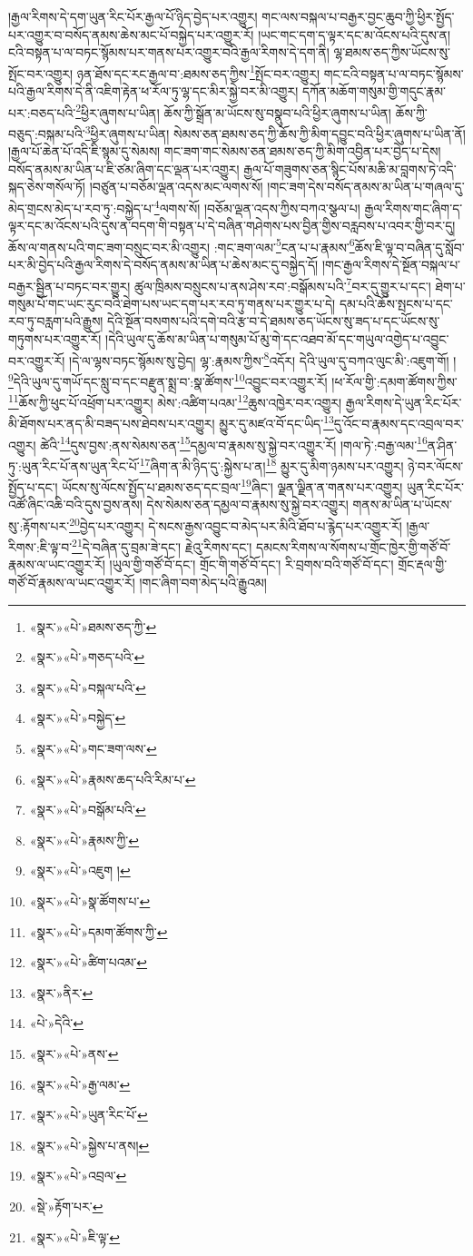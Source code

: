 །རྒྱལ་རིགས་དེ་དག་ཡུན་རིང་པོར་རྒྱལ་པོ་ཉིད་བྱེད་པར་འགྱུར། གང་ལས་བསྐལ་པ་བརྒྱར་བྱང་ཆུབ་ཀྱི་ཕྱིར་སྤྱོད་པར་འགྱུར་བ་བསོད་ནམས་ཆེས་མང་པོ་བསྐྱེད་པར་འགྱུར་རོ། །ཡང་གང་དག་ད་ལྟར་དང་མ་འོངས་པའི་དུས་ན། ངའི་བསྟན་པ་ལ་བཏང་སྙོམས་པར་གནས་པར་འགྱུར་བའི་རྒྱལ་རིགས་དེ་དག་ནི། ལྷ་ཐམས་ཅད་ཀྱིས་ཡོངས་སུ་སྤོང་བར་འགྱུར། ཉན་ཐོས་དང་རང་རྒྱལ་བ་:ཐམས་ཅད་ཀྱིས་\footnote{«སྣར་»«པེ་»ཐམས་ཅད་ཀྱི་}སྤོང་བར་འགྱུར། གང་ངའི་བསྟན་པ་ལ་བཏང་སྙོམས་པའི་རྒྱལ་རིགས་དེ་ནི་འཇིག་རྟེན་ཕ་རོལ་ཏུ་ལྷ་དང་མིར་སྐྱེ་བར་མི་འགྱུར། དཀོན་མཆོག་གསུམ་གྱི་གདུང་རྣམ་པར་:བཅད་པའི་\footnote{«སྣར་»«པེ་»གཅད་པའི་}ཕྱིར་ཞུགས་པ་ཡིན། ཆོས་ཀྱི་སྒྲོན་མ་ཡོངས་སུ་བསྣུབ་པའི་ཕྱིར་ཞུགས་པ་ཡིན། ཆོས་ཀྱི་བཅུད་:བསྐམ་པའི་\footnote{«སྣར་»«པེ་»བསྐལ་པའི་}ཕྱིར་ཞུགས་པ་ཡིན། སེམས་ཅན་ཐམས་ཅད་ཀྱི་ཆོས་ཀྱི་མིག་དབྱུང་བའི་ཕྱིར་ཞུགས་པ་ཡིན་ནོ། །རྒྱལ་པོ་ཆེན་པོ་འདི་ཇི་སྙམ་དུ་སེམས། གང་ཟག་གང་སེམས་ཅན་ཐམས་ཅད་ཀྱི་མིག་འབྱིན་པར་བྱེད་པ་དེས། བསོད་ནམས་མ་ཡིན་པ་ཇི་ཙམ་ཞིག་དང་ལྡན་པར་འགྱུར། རྒྱལ་པོ་གཟུགས་ཅན་སྙིང་པོས་མཆི་མ་བླགས་ཏེ་འདི་སྐད་ཅེས་གསོལ་ཏོ། །བཙུན་པ་བཅོམ་ལྡན་འདས་མང་ལགས་སོ། །གང་ཟག་དེས་བསོད་ནམས་མ་ཡིན་པ་གཞལ་དུ་མེད་གྲངས་མེད་པ་རབ་ཏུ་:བསྐྱེད་པ་\footnote{«སྣར་»«པེ་»བསྐྱེད་}ལགས་སོ། །བཅོམ་ལྡན་འདས་ཀྱིས་བཀའ་སྩལ་པ། རྒྱལ་རིགས་གང་ཞིག་ད་ལྟར་དང་མ་འོངས་པའི་དུས་ན་བདག་གི་བསྟན་པ་དེ་བཞིན་གཤེགས་པས་བྱིན་གྱིས་བརླབས་པ་འབར་གྱི་བར་དུ། ཆོས་ལ་གནས་པའི་གང་ཟག་བསྲུང་བར་མི་འགྱུར། :གང་ཟག་ལམ་\footnote{«སྣར་»«པེ་»གང་ཟག་ལས་}ངན་པ་པ་རྣམས་\footnote{«སྣར་»«པེ་»རྣམས་ཆད་པའི་རིམ་པ་}ཆོས་ཇི་ལྟ་བ་བཞིན་དུ་སློབ་པར་མི་བྱེད་པའི་རྒྱལ་རིགས་དེ་བསོད་ནམས་མ་ཡིན་པ་ཆེས་མང་དུ་བསྐྱེད་དོ། །གང་རྒྱལ་རིགས་དེ་སྔོན་བསྐལ་པ་བརྒྱར་སྦྱིན་པ་བཏང་བར་གྱུར། ཚུལ་ཁྲིམས་བསྲུངས་པ་ནས་ཤེས་རབ་:བསྒོམས་པའི་\footnote{«སྣར་»«པེ་»བསྒོམ་པའི་}བར་དུ་གྱུར་པ་དང་། ཐེག་པ་གསུམ་པོ་གང་ཡང་རུང་བའི་ཐེག་པས་ཡང་དག་པར་རབ་ཏུ་གནས་པར་གྱུར་པ་དེ། དམ་པའི་ཆོས་སྤངས་པ་དང་རབ་ཏུ་བརླག་པའི་རྒྱུས། དེའི་སྔོན་བསགས་པའི་དགེ་བའི་རྩ་བ་དེ་ཐམས་ཅད་ཡོངས་སུ་ཟད་པ་དང་ཡོངས་སུ་གཏུགས་པར་འགྱུར་རོ། །དེའི་ཡུལ་དུ་ཆོས་མ་ཡིན་པ་གསུམ་པོ་མུ་གེ་དང་འཐབ་མོ་དང་གཡུལ་འགྱེད་པ་འབྱུང་བར་འགྱུར་རོ། །དེ་ལ་ལྷས་བཏང་སྙོམས་སུ་བྱེད། ལྷ་:རྣམས་ཀྱིས་\footnote{«སྣར་»«པེ་»རྣམས་ཀྱི་}འདོར། དེའི་ཡུལ་དུ་བཀའ་ལུང་མི་:འཇུག་གོ། །\footnote{«སྣར་»«པེ་»འཇུག །}དེའི་ཡུལ་དུ་གཡོ་དང་སླུ་བ་དང་བརྫུན་སྨྲ་བ་:སྣ་ཚོགས་\footnote{«སྣར་»«པེ་»སྣ་ཚོགས་པ་}འབྱུང་བར་འགྱུར་རོ། །ཕ་རོལ་གྱི་:དམག་ཚོགས་ཀྱིས་\footnote{«སྣར་»«པེ་»དམག་ཚོགས་ཀྱི་}ཆོས་ཀྱི་ཕུང་པོ་འཕྲོག་པར་འགྱུར། མེས་:འཚིག་པའམ་\footnote{«སྣར་»«པེ་»ཚིག་པའམ་}ཆུས་འཁྱེར་བར་འགྱུར། རྒྱལ་རིགས་དེ་ཡུན་རིང་པོར་མི་ཐོགས་པར་ནད་མི་བཟད་པས་ཐེབས་པར་འགྱུར། མྱུར་དུ་མཛའ་བོ་དང་ཡིད་\footnote{«སྣར་»ནིར་}དུ་འོང་བ་རྣམས་དང་འབྲལ་བར་འགྱུར། ཚེའི་\footnote{«པེ་»དེའི་}དུས་བྱས་:ནས་སེམས་ཅན་\footnote{«སྣར་»«པེ་»ནས་}དམྱལ་བ་རྣམས་སུ་སྐྱེ་བར་འགྱུར་རོ། །གལ་ཏེ་:བརྒྱ་ལམ་\footnote{«སྣར་»«པེ་»རྒྱ་ལམ་}ན་ཤིན་ཏུ་:ཡུན་རིང་པོ་ནས་ཡུན་རིང་པོ་\footnote{«སྣར་»«པེ་»ཡུན་རིང་པོ་}ཞིག་ན་མི་ཉིད་དུ་:སྐྱེས་པ་ན།\footnote{«སྣར་»«པེ་»སྐྱེས་པ་ནས།} མྱུར་དུ་མིག་ཉམས་པར་འགྱུར། ཉེ་བར་ལོངས་སྤྱོད་པ་དང་། ཡོངས་སུ་ལོངས་སྤྱོད་པ་ཐམས་ཅད་དང་བྲལ་\footnote{«སྣར་»«པེ་»འབྲལ་}ཞིང་། ལྗན་ལྗིན་ན་གནས་པར་འགྱུར། ཡུན་རིང་པོར་འཚོ་ཞིང་འཆི་བའི་དུས་བྱས་ནས། དེས་སེམས་ཅན་དམྱལ་བ་རྣམས་སུ་སྐྱེ་བར་འགྱུར། གནས་མ་ཡིན་པ་ཡོངས་སུ་:རྟོགས་པར་\footnote{«སྡེ་»རྟོག་པར་}བྱེད་པར་འགྱུར། དེ་སངས་རྒྱས་འབྱུང་བ་མེད་པར་མིའི་ཐོབ་པ་རྙེད་པར་འགྱུར་རོ། །རྒྱལ་རིགས་:ཇི་ལྟ་བ་\footnote{«སྣར་»«པེ་»ཇི་ལྟ་}དེ་བཞིན་དུ་བྲམ་ཟེ་དང་། རྗེའུ་རིགས་དང་། དམངས་རིགས་ལ་སོགས་པ་གྲོང་ཁྱེར་གྱི་གཙོ་བོ་རྣམས་ལ་ཡང་འགྱུར་རོ། །ཡུལ་གྱི་གཙོ་བོ་དང་། གྲོང་གི་གཙོ་བོ་དང་། རི་བྲགས་བའི་གཙོ་བོ་དང་། གྲོང་རྡལ་གྱི་གཙོ་བོ་རྣམས་ལ་ཡང་འགྱུར་རོ། །གང་ཞིག་བག་མེད་པའི་རྒྱུའམ། 